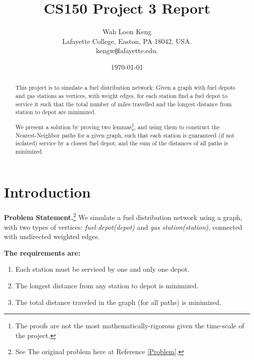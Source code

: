 \documentclass[12pt]{article}  %
\begin{document}
\title{CS150 Project 3 Report}

\author{Wah Loon Keng\\
Lafayette College, Easton, PA 18042, USA.\\
kengw{\tt @}lafayette.edu.}
\date{\today}
\maketitle

\begin{abstract}
This project is to simulate a fuel distribution network:
Given a graph with fuel depots and gas stations as vertices, with weight edges, for each station find a fuel depot to service it such that the total number of miles travelled and the longest distance from station to depot are minimized.

We present a solution by proving two lemmas\footnote{The proofs are not the most mathematically-rigorous given the time-scale of the project.}, and using them to construct the Nearest-Neighbor paths for a given graph, such that each station is guaranteed (if not isolated) service by a closest fuel depot; and the sum of the distances of all paths is minimized.

\end{abstract}











\section{Introduction} \label{intro}
{\bf Problem Statement.}\footnote{See The original problem here at Reference \ref{Problem}.} We simulate a fuel distribution network using a graph, with two types of vertices: \emph{fuel depot(depot)} and \emph{gas station(station)}, connected with undirected weighted edges.

{\bf{ The requirements are: }}
\begin{enumerate}
	\item Each station must be serviced by one and only one depot.
	\item The longest distance from any station to depot is minimized.
	\item The total distance traveled in the graph (for all paths) is minimized.
\end{enumerate}
\end{document}
